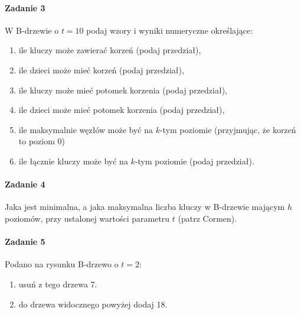 \documentclass[18pt]{extarticle}
\begin{document}
\paragraph{Zadanie 3} W B-drzewie o $t=10$ podaj wzory i wyniki numeryczne określające:
\begin{enumerate}[label=(\alph*)]
    \item ile kluczy może zawierać korzeń (podaj przedział),
    \item ile dzieci może mieć korzeń (podaj przedział),
    \item ile kluczy może mieć potomek korzenia (podaj przedział),
    \item ile dzieci może mieć potomek korzenia (podaj przedział),
    \item ile maksymalnie węzłów może być na $k$-tym poziomie (przyjmując, że korzeń to poziom $0$)
    \item ile łącznie kluczy może być na $k$-tym poziomie (podaj przedział).
\end{enumerate}

\paragraph{Zadanie 4} Jaka jest minimalna, a jaka maksymalna liczba kluczy w B-drzewie mającym $h$ poziomów, przy ustalonej wartości parametru $t$ (patrz Cormen).

\paragraph{Zadanie 5} Podano na rysunku B-drzewo o $t=2$:
\begin{center}
        \begin{enumerate}[label=-]
            \item usuń z tego drzewa 7.
            \item do drzewa widocznego powyżej dodaj 18.
        \end{enumerate}
\end{center}
\end{document}
